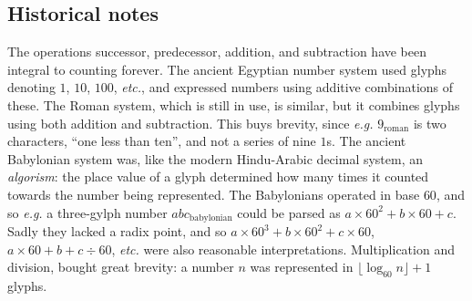 \label{sec:related}

%


\subsection{Historical notes}

The operations successor, predecessor, addition, and subtraction have
been integral to counting forever. The ancient Egyptian
number system used glyphs denoting $1$, $10$, $100$, \emph{etc.},
and expressed numbers using additive combinations of these.
The Roman system, which is still in use, is similar, but
it combines glyphs using both addition and subtraction. This buys brevity,
since \emph{e.g.} $9_{\text{roman}}$ is two characters, ``one less than ten'',
and not a series of nine $1$s.
The ancient Babylonian system was, like the modern Hindu-Arabic decimal system,
an \emph{algorism}: the place value of a glyph determined how many times it 
counted towards the number being represented.
The Babylonians operated in
base $60$, and so \emph{e.g.} a three-gylph number $abc_{\text{babylonian}}$ could
be parsed as $a \times 60^2 + b \times 60 + c$. Sadly they lacked
a radix point, and so
$a \times 60^3 + b \times 60^2 + c \times 60$, $a \times 60 + b + c \div 60$, 
\emph{etc.} were also reasonable interpretations. 
Multiplication and division, bought great brevity: a number $n$ was 
represented in $\lfloor \log_{60}n \rfloor + 1$ glyphs.


